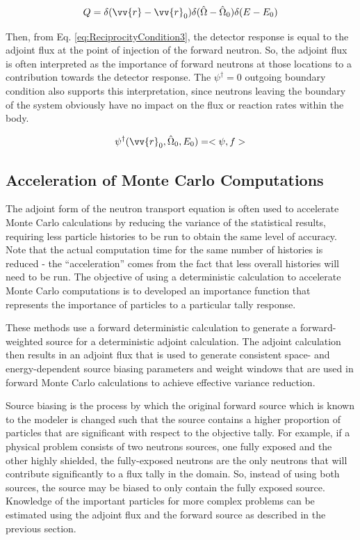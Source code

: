 \documentclass[10pt]{article}
\begin{document}
\begin{flushleft}
\begin{equation}
Q=\delta(\vv{r}-\vv{r}_0)\delta(\hat{\Omega}-\hat{\Omega}_0)\delta(E-E_0)
\end{equation}

Then, from Eq. \eqref{eq:ReciprocityCondition3}, the detector response is equal to the adjoint flux at the point of injection of the forward neutron. So, the adjoint flux is often interpreted as the importance of forward neutrons at those locations to a contribution towards the detector response. The \(\psi^\dagger=0\) outgoing boundary condition also supports this interpretation, since neutrons leaving the boundary of the system obviously have no impact on the flux or reaction rates within the body. 

\begin{equation}
\label{eq:ReciprocityCondition3}
\psi^\dagger(\vv{r}_0,\hat{\Omega}_0,E_0)=<\psi,f>
\end{equation}

\subsection{Acceleration of Monte Carlo Computations}

The adjoint form of the neutron transport equation is often used to accelerate Monte Carlo calculations by reducing the variance of the statistical results, requiring less particle histories to be run to obtain the same level of accuracy. Note that the actual computation time for the same number of histories is reduced - the ``acceleration'' comes from the fact that less overall histories will need to be run. The objective of using a deterministic calculation to accelerate Monte Carlo computations is to developed an importance function that represents the importance of particles to a particular tally response. 

These methods use a forward deterministic calculation to generate a forward-weighted source for a deterministic adjoint calculation. The adjoint calculation then results in an adjoint flux that is used to generate consistent space- and energy-dependent source biasing parameters and weight windows that are used in forward Monte Carlo calculations to achieve effective variance reduction. 

Source biasing is the process by which the original forward source which is known to the modeler is changed such that the source contains a higher proportion of particles that are significant with respect to the objective tally. For example, if a physical problem consists of two neutrons sources, one fully exposed and the other highly shielded, the fully-exposed neutrons are the only neutrons that will contribute significantly to a flux tally in the domain. So, instead of using both sources, the source may be biased to only contain the fully exposed source. Knowledge of the important particles for more complex problems can be estimated using the adjoint flux and the forward source as described in the previous section. 


\end{flushleft}
\end{document}
